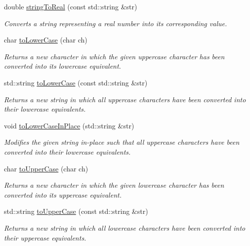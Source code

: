 \begin{DoxyCompactItemize}
double \mbox{\hyperlink{namespacesgl_1_1priv_1_1strlib_a6a7701384dec7dbee60264b792e613c7}{string\+To\+Real}} (const std\+::string \&str)
\begin{DoxyCompactList}\small\item\em Converts a string representing a real number into its corresponding value. \end{DoxyCompactList}\item 
char \mbox{\hyperlink{namespacesgl_1_1priv_1_1strlib_acad0624097ac17da5bda04d41c1363f7}{to\+Lower\+Case}} (char ch)
\begin{DoxyCompactList}\small\item\em Returns a new character in which the given uppercase character has been converted into its lowercase equivalent. \end{DoxyCompactList}\item 
std\+::string \mbox{\hyperlink{namespacesgl_1_1priv_1_1strlib_ad8200839a864ebdf2f129fbffa33967b}{to\+Lower\+Case}} (const std\+::string \&str)
\begin{DoxyCompactList}\small\item\em Returns a new string in which all uppercase characters have been converted into their lowercase equivalents. \end{DoxyCompactList}\item 
void \mbox{\hyperlink{namespacesgl_1_1priv_1_1strlib_a35dff265e3225cca9aacba6254d4e083}{to\+Lower\+Case\+In\+Place}} (std\+::string \&str)
\begin{DoxyCompactList}\small\item\em Modifies the given string in-\/place such that all uppercase characters have been converted into their lowercase equivalents. \end{DoxyCompactList}\item 
char \mbox{\hyperlink{namespacesgl_1_1priv_1_1strlib_a13fc513819fb1d0c1aad0dce15fdcecc}{to\+Upper\+Case}} (char ch)
\begin{DoxyCompactList}\small\item\em Returns a new character in which the given lowercase character has been converted into its uppercase equivalent. \end{DoxyCompactList}\item 
std\+::string \mbox{\hyperlink{namespacesgl_1_1priv_1_1strlib_aa504de245b08376b4309366fa40a5815}{to\+Upper\+Case}} (const std\+::string \&str)
\begin{DoxyCompactList}\small\item\em Returns a new string in which all lowercase characters have been converted into their uppercase equivalents. \end{DoxyCompactList}\item 

\end{DoxyCompactItemize}
